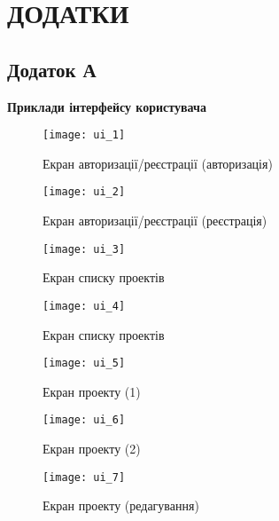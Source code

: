\setcounter{chapter}{1}
\setcounter{figure}{0}
\renewcommand\thechapter{\Alph{chapter}}

\chapter*{ДОДАТКИ}

\centeredsection

\section*{Додаток А}
\begin{center}
	\bfseries Приклади інтерфейсу користувача
\end{center}

\begin{figure}[H]
	\centering
	\texttt{[image: ui\_1]}
	\caption{Екран авторизації/реєстрації (авторизація)}
	\label{scr_ui_auth}
\end{figure}

\begin{figure}[H]
	\centering
	\texttt{[image: ui\_2]}
	\caption{Екран авторизації/реєстрації (реєстрація)}
	\label{scr_ui_signup}
\end{figure}

\begin{figure}[H]
	\centering
	\texttt{[image: ui\_3]}
	\caption{Екран списку проектів}
	\label{scr_ui_projects_list}
\end{figure}

\begin{figure}[H]
	\centering
	\texttt{[image: ui\_4]}
	\caption{Екран списку проектів}
	\label{scr_ui_project_creation}
\end{figure}

\begin{figure}[H]
	\centering
	\texttt{[image: ui\_5]}
	\caption{Екран проекту (1)}
	\label{scr_ui_project_1}
\end{figure}

\begin{figure}[H]
	\centering
	\texttt{[image: ui\_6]}
	\caption{Екран проекту (2)}
	\label{scr_ui_project_2}
\end{figure}

\begin{figure}[H]
	\centering
	\texttt{[image: ui\_7]}
	\caption{Екран проекту (редагування)}
	\label{scr_ui_project_edit}
\end{figure}

